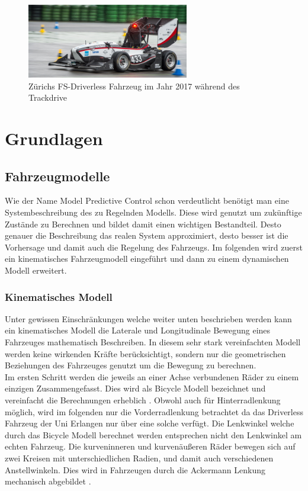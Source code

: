 \documentclass{like}
\begin{document}
\begin{figure}[hb!]
	\caption{Zürichs FS-Driverless Fahrzeug im Jahr 2017 während des Trackdrive}
	\includegraphics[width=200pt]{Abbildungen/amz-driverless-long.jpg}
\end{figure}


\chapter{Grundlagen}

\section{Fahrzeugmodelle}
Wie der Name Model Predictive Control schon verdeutlicht benötigt man eine Systembeschreibung des zu Regelnden Modells. Diese wird genutzt um zukünftige Zustände zu Berechnen und bildet damit einen wichtigen Bestandteil. Desto genauer die Beschreibung das realen System approximiert, desto besser ist die Vorhersage und damit auch die Regelung des Fahrzeugs.
Im folgenden wird zuerst ein kinematisches Fahrzeugmodell eingeführt und dann zu einem dynamischen Modell erweitert.   

\subsection{Kinematisches Modell}
Unter gewissen Einschränkungen welche weiter unten beschrieben werden kann ein kinematisches Modell die Laterale und Longitudinale Bewegung eines Fahrzeuges mathematisch Beschreiben. In diesem sehr stark vereinfachten Modell werden keine wirkenden Kräfte berücksichtigt, sondern nur die geometrischen Beziehungen des Fahrzeuges genutzt um die Bewegung zu berechnen. \\
Im ersten Schritt werden die jeweils an einer Achse verbundenen Räder zu einem einzigen Zusammengefasst. Dies wird als Bicycle Modell bezeichnet und vereinfacht die Berechnungen erheblich \cite{BicycleModel}. Obwohl auch für Hinterradlenkung möglich, wird im folgenden nur die Vorderradlenkung betrachtet da das Driverless Fahrzeug der Uni Erlangen nur über eine solche verfügt. Die Lenkwinkel welche durch das Bicycle Modell berechnet werden entsprechen nicht den Lenkwinkel am echten Fahrzeug. Die kurveninneren und kurvenäußeren Räder bewegen sich auf zwei Kreisen mit unterschiedlichen Radien, und damit auch verschiedenen Anstellwinkeln. Dies wird in Fahrzeugen durch die Ackermann Lenkung mechanisch abgebildet \cite{rajamani2011vehicle}.
\end{document}
